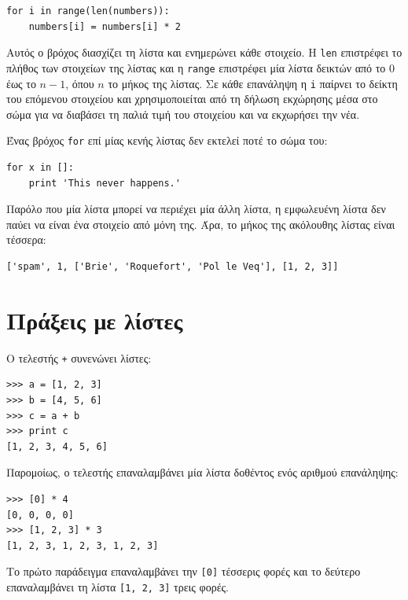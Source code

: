 \documentclass[10pt]{book}
\begin{document}
\begin{verbatim}
for i in range(len(numbers)):
    numbers[i] = numbers[i] * 2
\end{verbatim}
%

Αυτός ο βρόχος διασχίζει τη λίστα και ενημερώνει κάθε στοιχείο. Η {\tt len} 
επιστρέφει το πλήθος των στοιχείων της λίστας και η {\tt range} επιστρέφει μία
λίστα δεικτών από το 0 έως το $n-1$, όπου $n$ το μήκος της λίστας. Σε κάθε επανάληψη η {\tt i} παίρνει το δείκτη του επόμενου στοιχείου και χρησιμοποιείται από τη δήλωση εκχώρησης μέσα στο σώμα για να διαβάσει τη παλιά τιμή του στοιχείου και να εκχωρήσει την νέα.

Ένας βρόχος {\tt for} επί μίας κενής λίστας δεν εκτελεί ποτέ το σώμα του:

\begin{verbatim}
for x in []:
    print 'This never happens.'
\end{verbatim}
%

Παρόλο που μία λίστα μπορεί να περιέχει μία άλλη λίστα, η εμφωλευένη λίστα δεν παύει να είναι ένα στοιχείο από μόνη της. Άρα, το μήκος της ακόλουθης λίστας είναι τέσσερα:

\begin{verbatim}
['spam', 1, ['Brie', 'Roquefort', 'Pol le Veq'], [1, 2, 3]]
\end{verbatim}



\section{Πράξεις με λίστες}

Ο τελεστής {\tt +} συνενώνει λίστες:

\begin{verbatim}
>>> a = [1, 2, 3]
>>> b = [4, 5, 6]
>>> c = a + b
>>> print c
[1, 2, 3, 4, 5, 6]
\end{verbatim}
%

Παρομοίως, ο τελεστής {\tt *} επαναλαμβάνει μία λίστα δοθέντος ενός αριθμού επανάληψης:

\begin{verbatim}
>>> [0] * 4
[0, 0, 0, 0]
>>> [1, 2, 3] * 3
[1, 2, 3, 1, 2, 3, 1, 2, 3]
\end{verbatim}
%

Το πρώτο παράδειγμα επαναλαμβάνει την {\tt [0]} τέσσερις φορές και το δεύτερο επαναλαμβάνει τη λίστα {\tt [1, 2, 3]} τρεις φορές.
\end{document}
